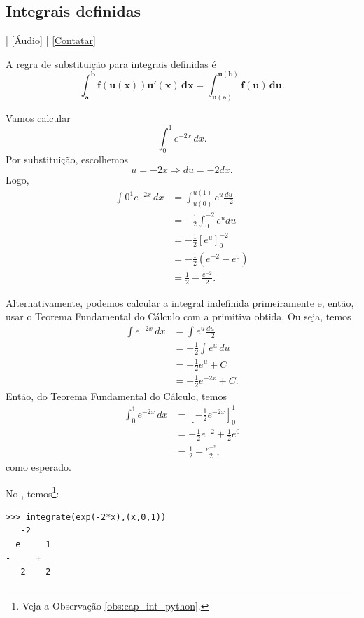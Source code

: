 \subsection{Integrais definidas}

\begin{flushright}
  [Vídeo] | [Áudio] | \href{https://phkonzen.github.io/notas/contato.html}{[Contatar]}
\end{flushright}

A regra de substituição para integrais definidas é
\begin{equation}
  \pmb{\int_a^b f(u(x))u'(x)\,dx = \int_{u(a)}^{u(b)} f(u)\,du}.
\end{equation}

\begin{ex}
  Vamos calcular
  \begin{equation}
    \int_0^1 e^{-2x}\,dx.
  \end{equation}
  Por substituição, escolhemos
  \begin{equation}
    u = -2x \Rightarrow du = -2dx.
  \end{equation}
  Logo,
  \begin{align}
    \int 0^1 e^{-2x}\,dx &= \int_{u(0)}^{u(1)} e^{u}\frac{du}{-2} \\
                         &= -\frac{1}{2}\int_{0}^{-2} e^udu \\
                         &= -\frac{1}{2}\left[e^u\right]_0^{-2} \\
                         &= -\frac{1}{2}\left(e^{-2} - e^0\right) \\
                         &= \frac{1}{2} - \frac{e^{-2}}{2}.
  \end{align}

  Alternativamente, podemos calcular a integral indefinida primeiramente e, então, usar o Teorema Fundamental do Cálculo com a primitiva obtida. Ou seja, temos
  \begin{align}
    \int e^{-2x}\,dx &= \int e^u\frac{du}{-2} \\
                     &= -\frac{1}{2}\int e^u\,du \\
                     &= -\frac{1}{2}e^u + C \\
                     &= -\frac{1}{2}e^{-2x} + C.
  \end{align}
  Então, do Teorema Fundamental do Cálculo, temos
  \begin{align}
    \int_0^1 e^{-2x}\,dx &= \left[-\frac{1}{2}e^{-2x}\right]_0^1 \\
                         &= -\frac{1}{2}e^{-2} + \frac{1}{2}e^{0} \\
                         &= \frac{1}{2} - \frac{e^{-2}}{2},
  \end{align}
  como esperado.

\ifispython
No \sympy, temos\footnote{Veja a Observação \ref{obs:cap_int_python}.}:
\begin{verbatim}
>>> integrate(exp(-2*x),(x,0,1))
   -2    
  e     1
-____ + __
   2    2
\end{verbatim}
\fi      
\end{ex}

